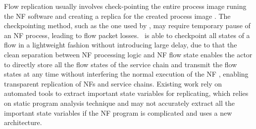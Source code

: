 Flow replication usually involves check-pointing the entire process image  runing the NF software %
and creating a replica for the created process image \cite{sherry2015rollback} \cite{rajagopalan2013pico}. The checkpointing method, such as the one used by \cite{sherry2015rollback}, may require temporary pause of an NF process, leading to flow packet losses. %
\nfactor~is able to checkpoint all states of a flow in a lightweight fashion without introducing large delay, due to that the clean separation between NF processing logic and NF flow state enables the actor to directly store all the flow states of the service chain and transmit the flow states at any time without interfering the normal execution of the NF%
, enabling transparent replication of NFs and service chains.  Existing work \cite{sherry2015rollback} rely on automated tools to extract important state variables for replicating, which relies on static program analysis technique and may not accurately extract all the important state variables if the NF program is complicated and uses a new architecture.%







